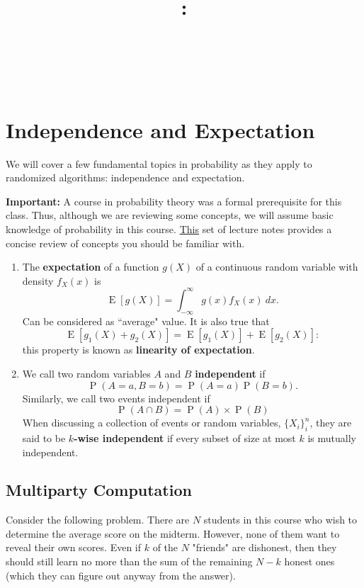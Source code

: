 \documentclass[14pt]{extreport}
\title{
    \vspace{1.75in}
    \textbf{\lectClass:\\ \lectTitle}\\
    \vspace{0.1in}\large{\textit{\lectClassInstructor\ \lectSection}}
    \vspace{2in}
    \author{\textbf{\lectAuthorName}}
    \date{}
}
\newcommand{\E}[1]{\operatorname{E}\left[#1\right]}
\renewcommand{\Pr}[1]{\operatorname{P}\left(#1\right)}
\begin{document}
\maketitle
\pagebreak

\section*{Independence and Expectation}
    We will cover a few fundamental topics in probability as they apply to randomized algorithms: independence and expectation.

    \vspace{2mm}
    \textbf{Important: } A course in probability theory was a formal prerequisite for this class. Thus, although we are reviewing some concepts, we will assume basic knowledge of probability in this course. \href{https://www.dropbox.com/s/kov36bgyt286hqp/17-notes-mfml-probreview.pdf?dl=0}{This} set of lecture notes provides a concise review of concepts you should be familiar with.

    \begin{enumerate}[label=\arabic*.]
        \item The \textbf{expectation} of a function $g(X)$ of a continuous random variable with density $f_{X}(x)$ is $$\E{g(X)} = \int_{-\infty}^{\infty} g(x) f_{X}(x)\ dx.$$ Can be considered as ``average" value. It is also true that $$\E{g_{1}(X) + g_{2}(X)} = \E{g_{1}(X)} + \E{g_{2}(X)}:$$ this property is known as \textbf{linearity of expectation}.
        \item We call two random variables $A$ and $B$ \textbf{independent} if $$\Pr{A = a, B  = b} = \Pr{A = a}\Pr{B = b}.$$ Similarly, we call two events independent if $$\Pr{A \cap B} = \Pr{A} \times \Pr{B}$$
        When discussing a collection of events or random variables, \( \{X_i\}_{i}^{n} \), they are said to be \textbf{$k$-wise independent} if every subset of size at most $k$ is mutually independent.
    \end{enumerate}

\subsection*{Multiparty Computation}
    Consider the following problem. There are $N$ students in this course who wish to determine the average score on the midterm. However, none of them want to reveal their own scores. Even if $k$ of the $N$ "friends" are dishonest, then they should still learn no more than the sum of the remaining $N - k$ honest ones (which they can figure out anyway from the answer). 
\end{document}
